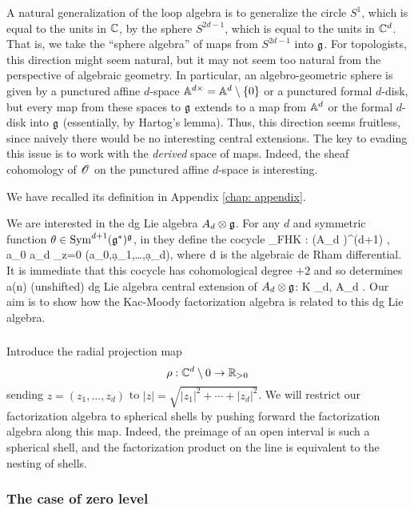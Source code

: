 A natural generalization of the loop algebra is to generalize the circle $S^1$, which is equal to the units in $\CC$, by the sphere $S^{2d-1}$, which is equal to the units in $\CC^d$.
That is, we take the ``sphere algebra'' of maps from $S^{2d-1}$ into $\fg$.
For topologists, this direction might seem natural,
but it may not seem too natural from the perspective of algebraic geometry.
In particular, an algebro-geometric sphere is given by a punctured affine $d$-space $\AA^{d\times} = \AA^d \setminus \{0\}$ or a punctured formal $d$-disk,
but every map from these spaces to $\fg$ extends to a map from $\AA^d$ or the formal $d$-disk into $\fg$ (essentially, by Hartog's lemma).
Thus, this direction seems fruitless, since naively there would be no interesting central extensions.
The key to evading this issue is to work with the {\em derived} space of maps. 
Indeed, the sheaf cohomology of $\sO$ on the punctured affine $d$-space is interesting. 

We have recalled its definition in Appendix \ref{chap: appendix}.

We are interested in the dg Lie algebra $A_d \tensor \fg$. 
For any $d$ and symmetric function $\theta \in \Sym^{d+1}(\fg^*)^\fg$, in \cite{FHK} they define the cocycle
\beqn\label{fhk cocycle}
\theta_{FHK} : (A_d \tensor \fg)^{\tensor (d+1)} \to \CC \;\; , \;\; a_0 \cdots a_d \mapsto \Res_{z=0} \theta(a_0,\d a_1,\ldots,\d a_d),
\eeqn
where $\d$ is the algebraic de Rham differential.
It is immediate that this cocycle has cohomological degree $+2$ and so determines a(n) (unshifted) dg Lie algebra central extension of $A_d \tensor \fg$:
\beqn\label{gdt}
\CC \cdot K \to \Hat{\fg}_{d, \theta} \to A_d \tensor \fg .
\eeqn
Our aim is to show how the Kac-Moody factorization algebra is related to this dg Lie algebra. 

\subsubsection{}

Introduce the radial projection map
\[
\rho : \CC^d \setminus 0 \to \RR_{>0}
\]
sending $z = (z_1, \ldots, z_d)$ to $|z| = \sqrt{|z_1|^2 + \cdots + |z_d|^2}$. 
We will restrict our factorization algebra to spherical shells by pushing forward the factorization algebra along this map.
Indeed, the preimage of an open interval is such a spherical shell, and the factorization product on the line is equivalent to the nesting of shells. 

\subsubsection{The case of zero level}

